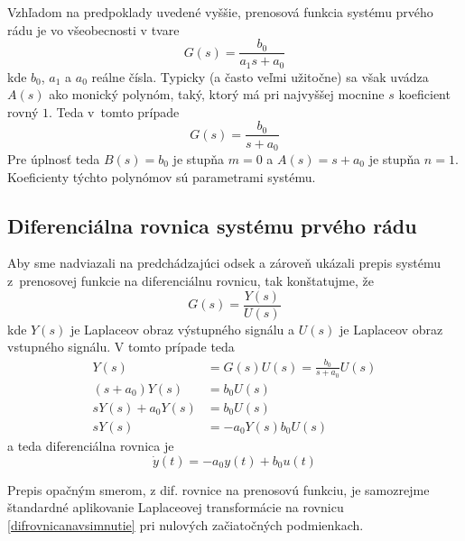 \documentclass[a4paper, 10pt, ]{article}
\begin{document}
Vzhľadom na predpoklady uvedené vyššie, prenosová funkcia systému prvého rádu je vo všeobecnosti v tvare
\begin{equation}
    G(s) = \frac{b_0}{a_1 s + a_0}
\end{equation}
kde $b_0$, $a_1$ a $a_0$ reálne čísla. Typicky (a často veľmi užitočne) sa však uvádza $A(s)$ ako monický polynóm, taký, ktorý má pri najvyššej mocnine $s$ koeficient rovný $1$. Teda v~tomto prípade
\begin{equation} \label{eq:prvyradprenosovafunkcia}
    G(s) = \frac{b_0}{s + a_0}
\end{equation}
Pre úplnosť teda $B(s) = b_0$ je stupňa $m=0$ a $A(s) = s + a_0$ je stupňa $n=1$. Koeficienty týchto polynómov sú parametrami systému.



\subsection{Diferenciálna rovnica systému prvého rádu}

Aby sme nadviazali na predchádzajúci odsek a zároveň ukázali prepis systému z~prenosovej funkcie na diferenciálnu rovnicu, tak konštatujme, že
\begin{equation}
    G(s) = \frac{Y(s)}{U(s)}
\end{equation}
kde $Y(s)$ je Laplaceov obraz výstupného signálu a $U(s)$ je Laplaceov obraz vstupného signálu. V tomto prípade teda
\begin{subequations}
\begin{align}
    Y(s) &= G(s) U(s) = \frac{b_0}{s + a_0} U(s) \\
    \left(s + a_0\right) Y(s) &= b_0 U(s) \\
    s Y(s) + a_0 Y(s) &= b_0 U(s) \\
    s Y(s)  &= -  a_0 Y(s) b_0 U(s) 
\end{align}
\end{subequations}
a teda diferenciálna rovnica je
\begin{equation} \label{difrovnicanavsimnutie}
    \dot y(t) = - a_0 y(t) + b_0 u(t)
\end{equation}

Prepis opačným smerom, z dif. rovnice na prenosovú funkciu, je samozrejme štandardné aplikovanie Laplaceovej transformácie na rovnicu \eqref{difrovnicanavsimnutie} pri nulových začiatočných podmienkach. 
\end{document}
